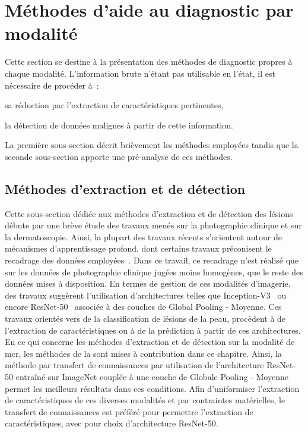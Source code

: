 \section{Méthodes d'aide au diagnostic par modalité}
\label{sec:modality_diagnosis}
Cette section se destine à la présentation des méthodes de diagnostic propres à chaque modalité. L'information brute n'étant pas utilisable en l'état, il est nécessaire de procéder à~:
\begin{inlinerate}
    \item sa réduction par l'extraction de caractéristiques pertinentes,
    \item la détection de données malignes à partir de cette information.
\end{inlinerate} La première sous-section décrit brièvement les méthodes employées tandis que la seconde sous-section apporte une pré-analyse de ces méthodes.\par

\subsection{Méthodes d'extraction et de détection}
Cette sous-section dédiée aux méthodes d'extraction et de détection des lésions débute par une brève étude des travaux menés sur la photographie clinique et sur la dermatoscopie. Ainsi, la plupart des travaux récents s'orientent autour de mécanismes d'apprentissage profond, dont certains travaux préconisent le recadrage des données employées~\cite{Li2018}. Dans ce travail, ce recadrage n'est réalisé que sur les données de photographie clinique jugées moins homogènes, que le reste des données mises à disposition. En termes de gestion de ces modalités d'imagerie, des travaux suggèrent l'utilisation d'architectures telles que Inception-V3~\cite{Esteva2017,Fan2020} ou encore ResNet-50~\cite{Xie2018, Alantari2018} associée à des couches de Global Pooling - Moyenne. Ces travaux orientés vers de la classification de lésions de la peau, procèdent à de l'extraction de caractéristiques ou à de la prédiction à partir de ces architectures. En ce qui concerne les méthodes d'extraction et de détection sur la modalité de \gls{mcr}, les méthodes de la  sont mises à contribution dans ce chapitre. Ainsi, la méthode par transfert de connaissances par utilisation de l'architecture ResNet-50 entraîné sur ImageNet couplée à une couche de Globale Pooling - Moyenne permet les meilleurs résultats dans ces conditions. Afin d'uniformiser l'extraction de caractéristiques de ces diverses modalités et par contraintes matérielles, le transfert de connaissances est préféré pour permettre l'extraction de caractéristiques, avec pour choix d'architecture ResNet-50.\par

